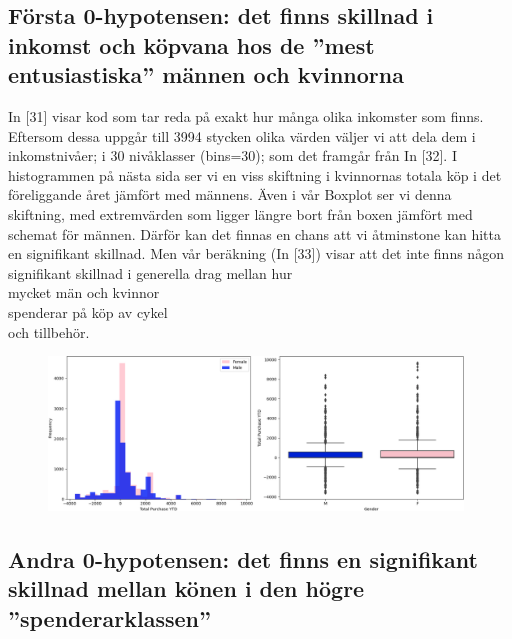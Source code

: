\documentclass[10pt]{article}
\begin{document}
\subsection{Första 0-hypotensen: det finns skillnad i inkomst och köpvana hos de ''mest entusiastiska'' männen och kvinnorna}
In [31] visar kod som tar reda på exakt hur många olika inkomster som finns. Eftersom dessa uppgår till 3994 stycken olika värden väljer vi att dela dem i inkomstnivåer; i 30 nivåklasser (bins=30); som det framgår från In [32]. I histogrammen på nästa sida ser vi en viss skiftning i kvinnornas totala köp i det föreliggande året jämfört med männens. Även i vår Boxplot ser vi denna skiftning, med extremvärden som ligger längre bort från boxen jämfört med schemat för männen. Därför kan det finnas en chans att vi åtminstone kan hitta en signifikant skillnad. Men vår beräkning (In [33]) visar att det inte finns någon signifikant
skillnad i generella drag mellan hur\\
mycket män och kvinnor\\
spenderar på köp av cykel\\
och tillbehör.
\begin{figure}[h]
    \centering
    \includegraphics[width=0.98\textwidth]{img_boxplot.png}
\end{figure}







\subsection{Andra 0-hypotensen: det finns en signifikant skillnad mellan könen i den högre ''spenderarklassen''}
\end{document}
